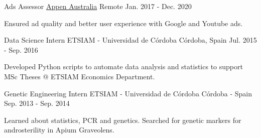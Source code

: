 

\begin{cventries}

  \cventry
    {Ads Assessor}
    {\href{https://appen.com/}{Appen Australia}}
    {Remote}
    {Jan. 2017 - Dec. 2020}
     {
      \begin{cvitems}
        \item {Ensured ad quality and better user experience with Google and Youtube ads.}
      \end{cvitems}
    }

  \cventry
    {Data Science Intern}
    {ETSIAM - Universidad de Córdoba}
    {Córdoba, Spain}
    {Jul. 2015 - Sep. 2016}
     {
      \begin{cvitems}
        \item {Developed Python scripts to automate data analysis and statistics to support MSc Theses @ ETSIAM Economics Department.}
      \end{cvitems}
    }

  \cventry
    {Genetic Engineering Intern}
    {ETSIAM - Universidad de Córdoba}
    {Córdoba - Spain}
    {Sep. 2013 - Sep. 2014}
     {
      \begin{cvitems}
        \item {Learned about statistics, PCR and genetics. Searched for genetic markers for androsterility in Apium Graveolens.}
      \end{cvitems}
    }

\end{cventries}
